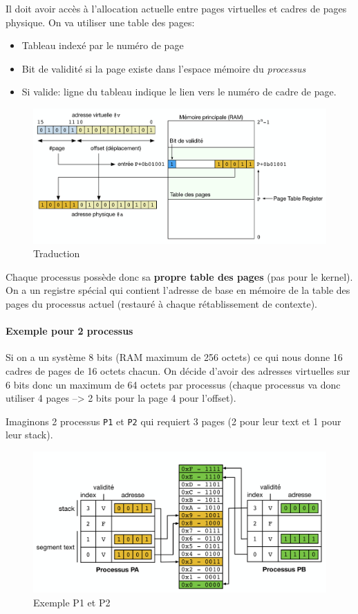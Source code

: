 Il doit avoir accès à l'allocation actuelle entre pages virtuelles et
cadres de pages physique. On va utiliser une table des pages:

\begin{itemize}
\tightlist
\item
  Tableau indexé par le numéro de page
\item
  Bit de validité si la page existe dans l'espace mémoire du
  \emph{processus}
\item
  Si valide: ligne du tableau indique le lien vers le numéro de cadre de
  page.
\end{itemize}

\begin{figure}
\centering
\includegraphics{image-54.png}
\caption{Traduction}
\end{figure}

Chaque processus possède donc sa \textbf{propre table des pages} (pas
pour le kernel). On a un registre spécial qui contient l'adresse de base
en mémoire de la table des pages du processus actuel (restauré à chaque
rétablissement de contexte).

\paragraph{Exemple pour 2 processus}\label{exemple-pour-2-processus}

Si on a un système 8 bits (RAM maximum de 256 octets) ce qui nous donne
16 cadres de pages de 16 octets chacun. On décide d'avoir des adresses
virtuelles sur 6 bits donc un maximum de 64 octets par processus (chaque
processus va donc utiliser 4 pages --\textgreater{} 2 bits pour la page
4 pour l'offset).

Imaginons 2 processus \texttt{P1} et \texttt{P2} qui requiert 3 pages (2
pour leur text et 1 pour leur stack).

\begin{figure}
\centering
\includegraphics{image-55.png}
\caption{Exemple P1 et P2}
\end{figure}

